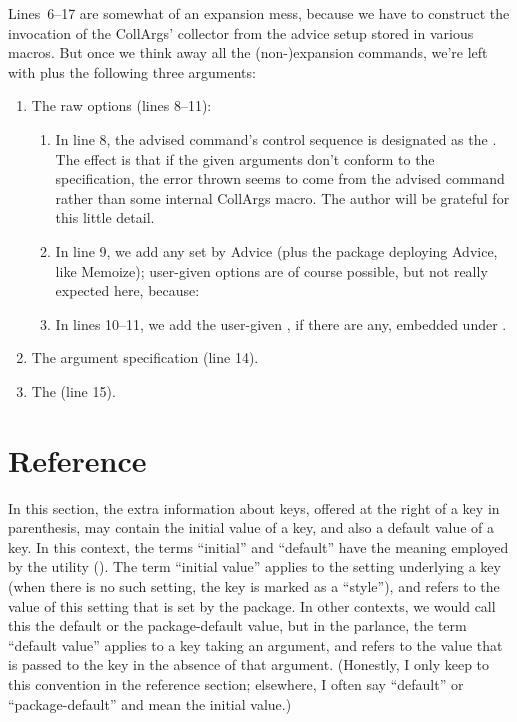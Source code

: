 \documentclass[a4paper,11pt]{article}
\begin{document}
Lines~6--17 are somewhat of an expansion mess, because we have to construct the
invocation of the CollArgs' collector from the advice setup stored in various
macros.  But once we think away all the (non-)expansion commands, we're left
with  plus the following three arguments:
\begin{enumerate}
\item The raw options (lines 8--11):
  \begin{enumerate}
  \item In line 8, the advised command's control sequence is designated as the
    .  The effect is that if the given arguments don't
    conform to the specification, the error thrown seems to come from the
    advised command rather than some internal CollArgs macro.  The author will
    be grateful for this little detail.
  \item In line 9, we add any  set by Advice
    (plus the package deploying Advice, like Memoize); user-given options are of
    course possible, but not really expected here, because:
  \item In lines 10--11, we add the user-given ,
    if there are any, embedded under .
  \end{enumerate}
\item The argument specification (line 14).
\item The  (line 15).
\end{enumerate}



\section{Reference}
\label{sec:reference}

In this section, the extra information about keys, offered at the right of a
key in parenthesis, may contain the initial value of a key, and also a default
value of a key.  In this context, the terms ``initial'' and ``default'' have
the meaning employed by the  utility ().  The term
``initial value'' applies to the setting underlying a key (when there is no
such setting, the key is marked as a ``style''), and refers to the value of
this setting that is set by the package.  In other contexts, we would call this
the default or the package-default value, but in the  parlance,
the term ``default value'' applies to a key taking an argument, and refers to
the value that is passed to the key in the absence of that argument.
(Honestly, I only keep to this convention in the reference section; elsewhere,
I often say ``default'' or ``package-default'' and mean the initial value.)
\end{document}
